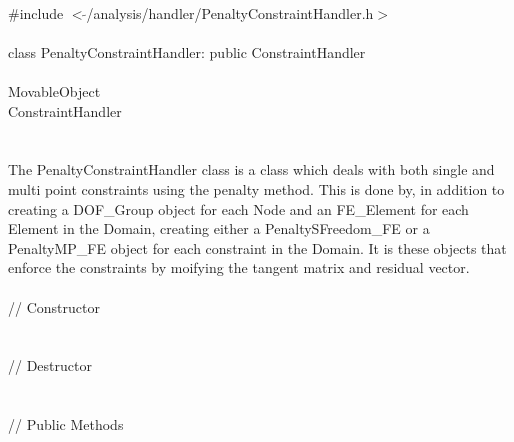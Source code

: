 
   \\
\indent \#include $<\tilde{
}$/analysis/handler/PenaltyConstraintHandler.h$>$  \\ 

  \\
\indent class PenaltyConstraintHandler: public ConstraintHandler  \\

 \\
\indent MovableObject \\
\indent\indent ConstraintHandler \\
\indent\indent{} \\

 \\ 
\indent The PenaltyConstraintHandler class is a class which deals with
both single and multi point constraints using the penalty method. 
This is done by, in addition to creating a DOF\_Group object
for each Node and an FE\_Element for each Element in the Domain,
creating either a PenaltySFreedom\_FE or a PenaltyMP\_FE object for each
constraint in the Domain. It is these objects that enforce the
constraints by moifying the tangent matrix and residual vector. \\ 


 \\
\indent // Constructor \\
\\  \\ 
\indent // Destructor \\
\\  \\
\indent // Public Methods\\
 \\ 
 \\ \\
 \\
 \\


